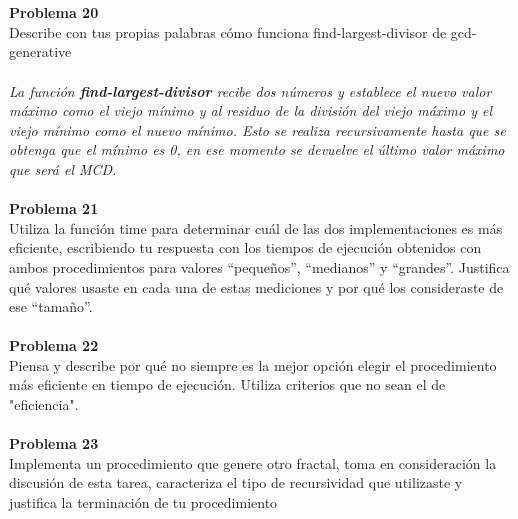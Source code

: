 \documentclass[14pt]{article}
\begin{document}
	\\
	\\{\large\textbf{Problema 20}}
	\\Describe con tus propias palabras cómo funciona find-largest-divisor de gcd-generative
	\\
	\\\textit{La función \textbf{find-largest-divisor} recibe dos números y establece el nuevo valor máximo como el viejo mínimo y al residuo de la división del viejo máximo y el viejo mínimo como el nuevo mínimo. Esto se realiza recursivamente hasta que se obtenga que el mínimo es 0, en ese momento se devuelve el último valor máximo que será el MCD.}
	\\
	\\{\large\textbf{Problema 21}}
	\\Utiliza la función time para determinar cuál de las dos implementaciones es más
	eficiente, escribiendo tu respuesta con los tiempos de ejecución obtenidos con ambos procedimientos
	para valores “pequeños”, “medianos” y “grandes”. Justifica qué valores usaste en cada una de estas
	mediciones y por qué los consideraste de ese “tamaño”.
	\\
	\\{\large\textbf{Problema 22}}
	\\ Piensa y describe por qué no siempre es la mejor opción elegir el procedimiento más
	eficiente en tiempo de ejecución. Utiliza criterios que no sean el de "eficiencia".
	\\
	\\{\large\textbf{Problema 23}}
	\\Implementa un procedimiento que genere otro fractal, toma en consideración la discusión de esta tarea, caracteriza el tipo de recursividad que utilizaste y justifica la terminación de tu procedimiento
\end{document}
